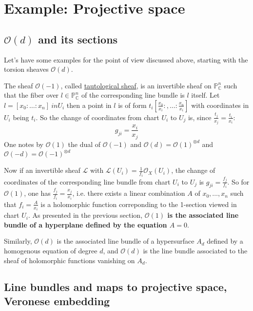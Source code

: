 \documentclass[11pt]{article}
\begin{document}
\section{Example: Projective space}
\label{sec:org9481b42}
\subsection{\(\mathcal{O}(d)\) and its sections}
\label{sec:orgd6da54a}

Let's have some examples for the point of view discussed above, starting with the torsion
sheaves \(\mathcal{O}(d)\).

The sheaf \(\mathcal{O}(-1)\), called \uline{tautological sheaf}, is an invertible sheaf on \(\mathbb{P}^n_{\mathbb{C}}\) such that the fiber over \(l\in \mathbb{P}^n_{\mathbb{C}}\) of the corresponding line
bundle is \(l\) itself. Let \(l=[x_0:\dots:x_n] \ in U_i\) then a point in \(l\) is
of form \(t_i[\frac{x_0}{x_i}:,\dots:\frac{x_n}{x_i}]\) with coordinates in \(U_i\)
being \(t_i\). So the change of coordinates from chart \(U_i\) to \(U_j\) is, since
\(\frac{t_j}{x_j} = \frac{t_i}{x_i}\):
\[
g_{ji} = \frac{x_i}{x_j}
\]
One notes by \(\mathcal{O}(1)\) the dual of \(\mathcal{O}(-1)\) and \(\mathcal{O}(d)
= \mathcal{O}(1)^{\otimes d}\) and \(\mathcal{O}(-d)=\mathcal{O}(-1)^{\otimes d}\)

Now if an invertible sheaf \(\mathcal{L}\) with \(\mathcal{L}(U_i) =
\frac{1}{f_i}\mathcal{O}_X(U_i)\), the change of coordinates of the corresponding line
bundle from chart \(U_i\) to \(U_j\) is \(g_{ji} = \frac{f_j}{f_i}\). So for \(\mathcal{O}(1)\), one has \(\frac{f_j}{f_i} = \frac{x_j}{x_i}\), i.e. there exists a
linear combination \(A\) of \(x_0,\dots, x_n\) such that \(f_i = \frac{A}{x_i}\) is
a holomorphic function correponding to the 1-section viewed in chart \(U_i\). As
presented in the previous section, \textbf{\(\mathcal{O}(1)\) is the associated line bundle of
a hyperplane defined by the equation \(A = 0\)}.

Similarly, \(\mathcal{O}(d)\) is the associated line bundle of a hypersurface \(A_d\) defined by
a homogenous equation of degree \(d\), and \(\mathcal{O}(d)\) is the line bundle
associated to the sheaf of holomorphic functions vanishing on \(A_d\).

\subsection{Line bundles and maps to projective space, Veronese embedding}
\label{sec:org6aae0cb}
\end{document}
